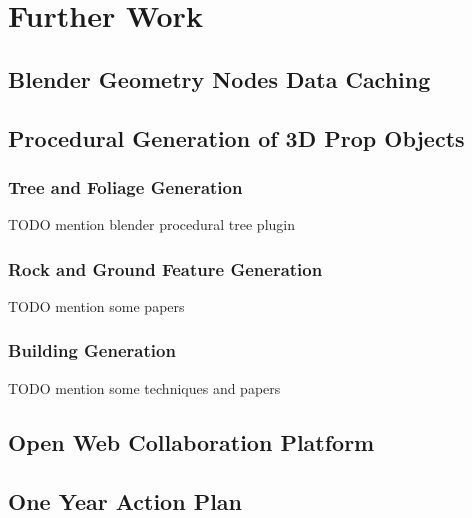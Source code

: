 \chapter{Further Work}
\label{chapter:further-work}

\section{Blender Geometry Nodes Data Caching}
\label{sec:future-blender-geom-nodes-data-caching}

\section{Procedural Generation of 3D Prop Objects}
\label{sec:future-proc-gen-obj}

\subsection{Tree and Foliage Generation}

TODO mention blender procedural tree plugin

\subsection{Rock and Ground Feature Generation}

TODO mention some papers

\subsection{Building Generation}

TODO mention some techniques and papers

\section{Open Web Collaboration Platform}
\label{sec:future-open-web-collaboration-platform}

\section{One Year Action Plan}
\label{sec:future-one-year-action-plan}
